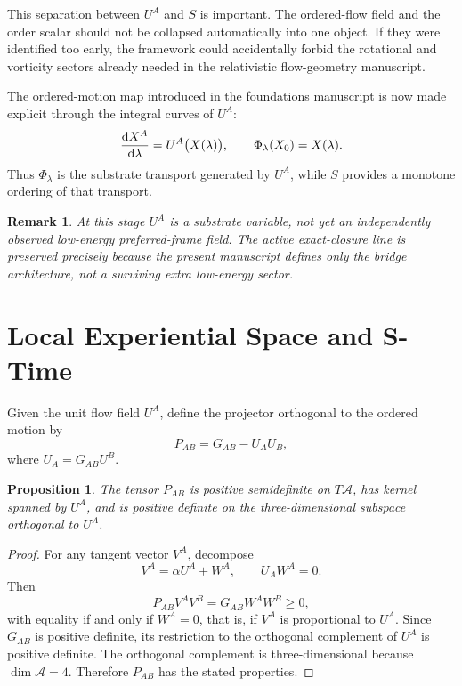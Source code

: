 \documentclass[11pt]{article}
\newcommand{\Sub}{\mathcal{A}}
\newtheorem{proposition}{Proposition}
\newtheorem{remark}{Remark}
\begin{document}
This separation between \(U^A\) and \(S\) is important. The ordered-flow field and the order scalar should not be collapsed automatically into one object. If they were identified too early, the framework could accidentally forbid the rotational and vorticity sectors already needed in the relativistic flow-geometry manuscript.

The ordered-motion map introduced in the foundations manuscript is now made explicit through the integral curves of \(U^A\):
\begin{equation}
\dv{X^A}{\lambda} = U^A\bigl(X(\lambda)\bigr),
\qquad
\Phi_\lambda(X_0) = X(\lambda).
\label{eq:flowmap}
\end{equation}
Thus \(\Phi_\lambda\) is the substrate transport generated by \(U^A\), while \(S\) provides a monotone ordering of that transport.

\begin{remark}
At this stage \(U^A\) is a substrate variable, not yet an independently observed low-energy preferred-frame field. The active exact-closure line is preserved precisely because the present manuscript defines only the bridge architecture, not a surviving extra low-energy sector.
\end{remark}

\section{Local Experiential Space and S-Time}

Given the unit flow field \(U^A\), define the projector orthogonal to the ordered motion by
\begin{equation}
P_{AB} = G_{AB} - U_A U_B,
\label{eq:substrateprojector}
\end{equation}
where \(U_A = G_{AB} U^B\).

\begin{proposition}
The tensor \(P_{AB}\) is positive semidefinite on \(T\Sub\), has kernel spanned by \(U^A\), and is positive definite on the three-dimensional subspace orthogonal to \(U^A\).
\end{proposition}

\begin{proof}
For any tangent vector \(V^A\), decompose
\[
V^A = \alpha U^A + W^A,
\qquad
U_A W^A = 0.
\]
Then
\[
P_{AB} V^A V^B
=
G_{AB} W^A W^B \ge 0,
\]
with equality if and only if \(W^A = 0\), that is, if \(V^A\) is proportional to \(U^A\). Since \(G_{AB}\) is positive definite, its restriction to the orthogonal complement of \(U^A\) is positive definite. The orthogonal complement is three-dimensional because \(\dim \Sub = 4\). Therefore \(P_{AB}\) has the stated properties.
\end{proof}
\end{document}
